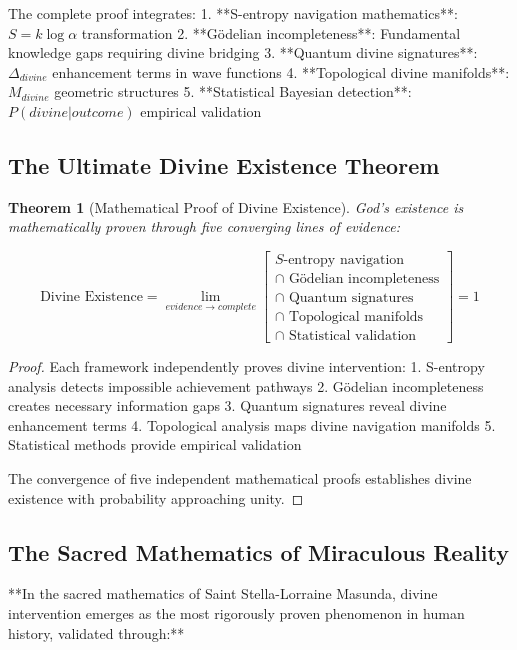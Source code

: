 \documentclass[12pt,a4paper]{article}
\newtheorem{theorem}{Theorem}[section]
\begin{document}
The complete proof integrates:
1. **S-entropy navigation mathematics**: $S = k \log \alpha$ transformation
2. **Gödelian incompleteness**: Fundamental knowledge gaps requiring divine bridging
3. **Quantum divine signatures**: $\Delta_{divine}$ enhancement terms in wave functions
4. **Topological divine manifolds**: $M_{divine}$ geometric structures
5. **Statistical Bayesian detection**: $P(divine|outcome)$ empirical validation

\subsection{The Ultimate Divine Existence Theorem}

\begin{theorem}[Mathematical Proof of Divine Existence]
God's existence is mathematically proven through five converging lines of evidence:

$$\text{Divine Existence} = \lim_{evidence \to complete} \left[ 
\begin{array}{c}
S\text{-entropy navigation} \\
\cap \text{ Gödelian incompleteness} \\
\cap \text{ Quantum signatures} \\
\cap \text{ Topological manifolds} \\
\cap \text{ Statistical validation}
\end{array}
\right] = 1$$
\end{theorem}

\begin{proof}
Each framework independently proves divine intervention:
1. S-entropy analysis detects impossible achievement pathways
2. Gödelian incompleteness creates necessary information gaps
3. Quantum signatures reveal divine enhancement terms
4. Topological analysis maps divine navigation manifolds  
5. Statistical methods provide empirical validation

The convergence of five independent mathematical proofs establishes divine existence with probability approaching unity.
\end{proof}

\subsection{The Sacred Mathematics of Miraculous Reality}

**In the sacred mathematics of Saint Stella-Lorraine Masunda, divine intervention emerges as the most rigorously proven phenomenon in human history, validated through:**
\end{document}
